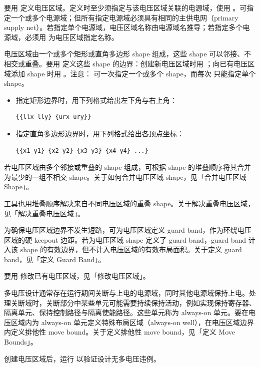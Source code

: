 要用  定义电压区域。定义时至少须指定与该电压区域关联的电源域，使用 。可指定一个或多个电源域；但所有指定电源域必须具有相同的主供电网（primary supply net）。若指定单个电源域，电压区域名称由电源域名推导；若指定多个电源域，必须用  为电压区域指定名称。

电压区域由一个或多个矩形或直角多边形 shape 组成，这些 shape 可以邻接、不相交或重叠。要用  定义这些 shape 的边界：创建新电压区域时用 ；向已有电压区域添加 shape 时用 。注意： 可一次指定一个或多个 shape，而每次  只能指定单个 shape。

\begin{itemize}
  \item 指定矩形边界时，用下列格式给出左下角与右上角：
\begin{lstlisting}
{{llx lly} {urx ury}}
\end{lstlisting}
  \item 指定直角多边形边界时，用下列格式给出各顶点坐标：
\begin{lstlisting}
{{x1 y1} {x2 y2} {x3 y3} {x4 y4} ...}
\end{lstlisting}
\end{itemize}

若电压区域由多个邻接或重叠的 shape 组成，可根据 shape 的堆叠顺序将其合并为最少的一组不相交 shape。关于如何合并电压区域 shape，见「合并电压区域 Shape」。

工具也用堆叠顺序解决来自不同电压区域的重叠 shape。关于解决重叠电压区域，见「解决重叠电压区域」。

为确保电压区域边界不发生短路，可为电压区域定义 guard band，作为环绕电压区域的硬 keepout 边距。若为电压区域 shape 定义了 guard band，guard band 计入该 shape 的有效边界，但不计入电压区域的有效布局面积。关于定义 guard band，见「定义 Guard Band」。

要用  修改已有电压区域，见「修改电压区域」。

多电压设计通常存在运行期间关断与上电的电源域，同时其他电源域保持上电。处理关断域时，关断部分中某些单元可能需要持续保持活动，例如实现保持寄存器、隔离单元、保持控制路径与隔离使能路径。这些单元称为 always-on 单元。要在电压区域内为 always-on 单元定义特殊布局区域（always-on well），在电压区域边界内定义排他性 move bound。关于定义排他性 move bound，见「定义 Move Bounds」。

创建电压区域后，运行  以验证设计无多电压违例。

